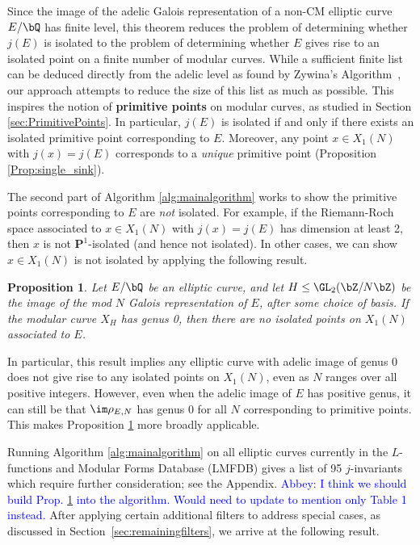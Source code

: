\documentclass[11pt,reqno]{amsart}
\theoremstyle{plain}
\newtheorem{proposition}[theorem]{Proposition}
\theoremstyle{definition}
\newcommand{\Q}{\bQ}
\newcommand{\Z}{\bZ}
\newcommand{\PP}{\mathbf P}
\newcommand{\abbey}[1]{\textcolor{blue}{Abbey: #1}}
\newcommand{\dldedit}[1]{{\color{Plum} #1}}
\begin{document}
\noindent Since the image of the adelic Galois representation of a non-CM elliptic curve $E/\Q$ has finite level, this theorem reduces the problem of determining whether $j(E)$ is isolated to the problem of determining whether $E$ gives rise to an isolated point on a finite number of modular curves.
While a sufficient finite list can be deduced directly from the adelic level as found by Zywina's Algorithm~\cite{ZywinaAlgorithm}, our \dldedit{approach attempts to reduce the size of this list as much as possible}.
This inspires the notion of \textbf{primitive points} on modular curves, as studied in Section \ref{sec:PrimitivePoints}. In particular, $j(E)$ is isolated if and only if there exists an isolated primitive point corresponding to $E$. Moreover, any point $x\in X_1(N)$ with $j(x)=j(E)$ corresponds to a \emph{unique} primitive point (Proposition \ref{Prop:single_sink}).

The second part of Algorithm \ref{alg:mainalgorithm} works to show the primitive points corresponding to $E$ are \emph{not} isolated. For example, if the Riemann-Roch space associated to $x \in X_1(N)$ with $j(x)=j(E)$ has dimension at least 2, then $x$ is not $\PP^1$-isolated (and hence not isolated). In other cases, we can show $x \in X_1(N)$ is not isolated by applying the following result.

\begin{proposition} \label{Prop:Genus0Intro}
Let $E/\Q$ be an elliptic curve, and let $H \leq \GL_2(\Z/N\Z)$ be the image of the mod $N$ Galois representation of $E$, after some choice of basis. If the modular curve $X_H$ has genus 0, then there are no isolated points on $X_1(N)$ associated to $E$.
\end{proposition}

\noindent In particular, this result implies any elliptic curve with adelic image of genus 0 does not give rise to any isolated points on $X_1(N)$, even as $N$ ranges over all positive integers. However, even when the adelic image of $E$ has positive genus, it can still be that $\im \rho_{E,N}$ has genus 0 for all $N$ corresponding to primitive points. This makes Proposition \ref{Prop:Genus0Intro} more broadly applicable.

Running Algorithm \ref{alg:mainalgorithm} on all elliptic curves currently in the $L$-functions and Modular Forms Database (LMFDB) \cite{LMFDB} gives a list of 95 $j$-invariants which require further consideration; see the Appendix. \abbey{I think we should build Prop. \ref{Prop:Genus0Intro} into the algorithm. Would need to update to mention only Table 1 instead.} After applying certain additional filters to address special cases, as discussed in Section~\ref{sec:remainingfilters}, we arrive at the following result.
\end{document}
